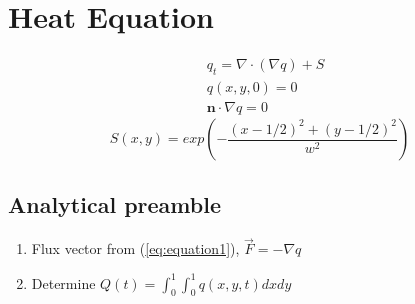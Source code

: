 

\section{Heat Equation} 

\label{sec:heat_equation}
\begin{align}
	& q_t = \nabla \cdot (\nabla q) + S \label{eq:equation1} \\
	& q(x,y,0) = 0 \label{eq:equation2} \\
	& \mathbf{n} \cdot \nabla q = 0 \label{eq:equation3}
\end{align}
\begin{equation}
	S(x,y) = exp \left(-\frac{(x-1/2)^2 + (y-1/2)^2}{w^2}\right)
	\label{eq:sourceFunction}
\end{equation} %

\subsection{Analytical preamble} %
\label{sub:analytical_preamble}
\begin{enumerate}
	\item Flux vector from (\ref{eq:equation1}), $\vec{F}=-\nabla q$
	\item Determine $Q(t) = \int_{0}^{1} \int_{0}^{1} q(x,y,t)dxdy$
\end{enumerate}
